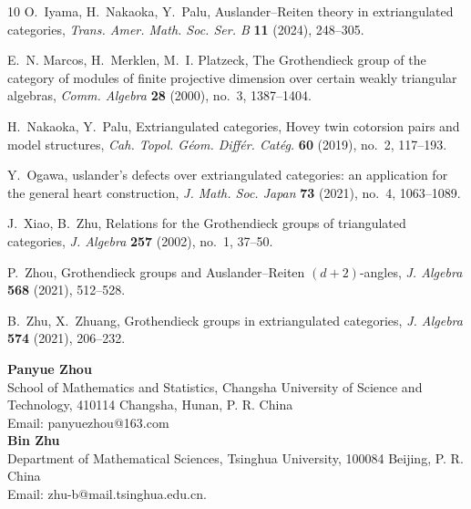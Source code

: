 \documentclass[11pt, twoside]{article}
\numberwithin{equation}{section}
\begin{document}
\begin{thebibliography}{10}
O.~Iyama, H.~Nakaoka, Y.~Palu,
\newblock Auslander--Reiten theory in extriangulated categories,
\newblock \emph{Trans. Amer. Math. Soc. Ser. B} \textbf{11} (2024), 248--305.


E.~N. Marcos, H.~Merklen, M.~I. Platzeck,
\newblock The {G}rothendieck group of the category of modules of finite
  projective dimension over certain weakly triangular algebras,
\newblock \emph{Comm. Algebra} \textbf{28} (2000), no.~3, 1387--1404.

H.~Nakaoka, Y.~Palu,
\newblock Extriangulated categories, {H}ovey twin cotorsion pairs and model
  structures,
\newblock \emph{Cah. Topol. G\'eom. Diff\'er. Cat\'eg.} \textbf{60} (2019),
  no.~2, 117--193.

Y.~Ogawa,
uslander's defects over extriangulated categories: an application for the general heart construction,
\newblock \emph{J. Math. Soc. Japan} \textbf{73} (2021), no.~4, 1063--1089.

J.~Xiao, B.~Zhu,
\newblock Relations for the {G}rothendieck groups of triangulated categories,
\newblock \emph{J. Algebra} \textbf{257} (2002), no.~1, 37--50.

P.~Zhou,
\newblock Grothendieck groups and {A}uslander--{R}eiten $(d+2)$-angles,
\newblock \emph{J. Algebra} \textbf{568} (2021), 512--528.

B.~Zhu, X.~Zhuang,
\newblock Grothendieck groups in extriangulated categories,
\newblock \emph{J. Algebra} \textbf{574} (2021), 206--232.

\end{thebibliography}


\hspace{-6.5mm}
\textbf{Panyue Zhou}\\
School of Mathematics and Statistics, Changsha University of Science and Technology, 410114 Changsha, Hunan, P. R. China\\
Email: panyuezhou@163.com\\

\hspace{-5mm}\textbf{Bin Zhu}\\
Department of Mathematical Sciences, Tsinghua University, 100084 Beijing, P. R. China\\
Email: zhu-b@mail.tsinghua.edu.cn.
\end{document}
